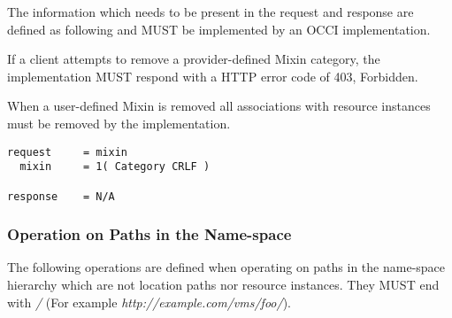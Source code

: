 \documentclass[10pt,a4paper]{article}
\begin{document}
\begin{description}
    The information which needs to be present in the request and
    response are defined as following and MUST be implemented by an
    OCCI implementation.
    
    If a client attempts to remove a provider-defined Mixin category,
    the implementation MUST respond with a HTTP error code of 403,
    Forbidden.
    
    When a user-defined Mixin is removed all associations with
    resource instances must be removed by the implementation.

\begin{verbatim}
request     = mixin
  mixin     = 1( Category CRLF )

response    = N/A
\end{verbatim}

\end{description}

\subsubsection{Operation on Paths in the Name-space}

The following operations are defined when operating on paths in the
name-space hierarchy which are not location paths nor resource
instances. They MUST end with \emph{/} (For example
\emph{http://example.com/vms/foo/}).
\end{document}
